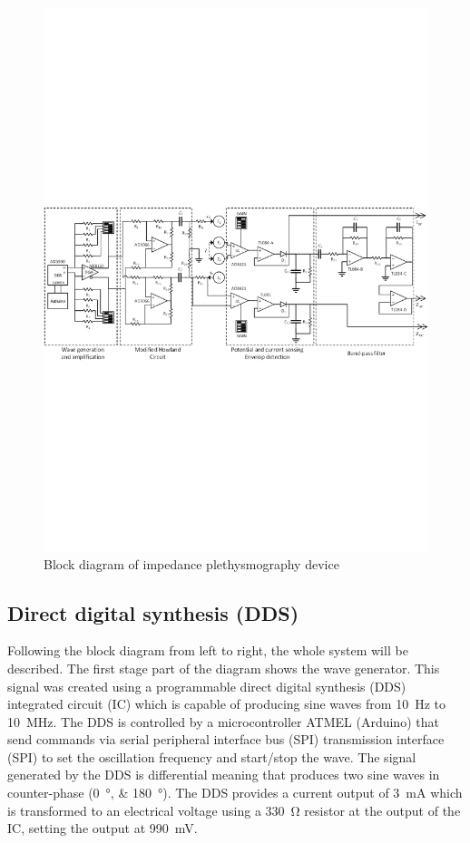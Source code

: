 \begin{figure}[!htpb]
	\centering
	\includegraphics[width=\textwidth,keepaspectratio]{figure2}
    \caption{Block diagram of impedance plethysmography device}
    \label{fig:block}
\end{figure}

\subsection{Direct digital synthesis (DDS)}
Following the block diagram from left to right, the whole system will be described. The first stage part of the diagram shows the wave generator. This signal was created using a programmable direct digital synthesis (DDS) integrated circuit (IC) which is capable of producing sine waves from \SI{10}{\hertz} to \SI{10}{\mega\hertz}. The DDS is controlled by a microcontroller ATMEL (Arduino) that send commands via serial peripheral interface bus (SPI) transmission interface (SPI) to set the oscillation frequency and start/stop the wave. The signal generated by the DDS is differential meaning that produces two sine waves in counter-phase (\SIlist{0;180}{\degree}). The DDS provides a current output of \SI{3}{\mA} which is transformed to an electrical voltage using a \SI{330}{\ohm} resistor at the output of the IC, setting the output at \SI{990}{\mV}. 

